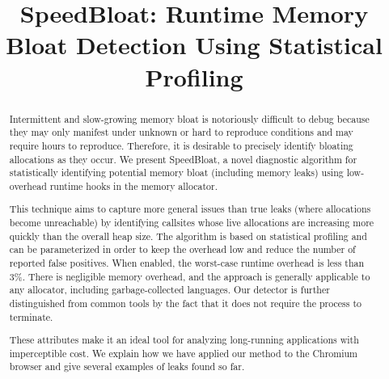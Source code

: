 \documentclass[preprint, numbers]{sigplanconf}
\begin{document}
\setlength{\pdfpageheight}{\paperheight}
\setlength{\pdfpagewidth}{\paperwidth}




\title{SpeedBloat: Runtime Memory Bloat Detection Using Statistical Profiling}
\subtitle{}

\iffalse
\authorinfo{Micha{\l} W{\l}odarczyk}%
           {University of Warsaw}
           {m.wlodarczyk@mimuw.edu.pl}
\authorinfo{Ben Cheng}
           {Google Inc.}
           {bccheng@google.com}
\authorinfo{Simon Que}
           {Google Inc.}
           {sque@google.com}
\fi
{}

\maketitle

\begin{abstract}
Intermittent and slow-growing memory bloat is notoriously difficult to
debug because they may only manifest under unknown or hard to
reproduce conditions and may require hours to reproduce.  Therefore,
it is desirable to precisely identify bloating allocations as they
occur.  We present SpeedBloat, a novel diagnostic algorithm for statistically
identifying potential memory bloat (including memory leaks) using
low-overhead runtime hooks in the memory allocator.

This technique aims to capture more general issues than true leaks
(where allocations become unreachable) by identifying callsites whose
live allocations are increasing more quickly than the overall heap size.
The algorithm is based on statistical profiling and can be parameterized in order to
keep the overhead low and reduce the number of reported false positives.
When enabled, the worst-case runtime overhead is less than 3\%.
There is negligible memory overhead, and the approach is generally applicable to any allocator, including garbage-collected languages.
Our detector is further distinguished from common tools by the fact that
it does not require the process to terminate.

These attributes make it an ideal tool for analyzing long-running applications with imperceptible cost.
We explain how we have applied our method to the Chromium browser and give
several examples of leaks found so far.
\end{abstract}
\end{document}
